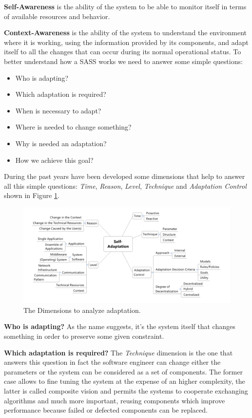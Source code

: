 \textbf{Self-Awareness} is the ability of the system to be able to monitor itself in terms of available resources and behavior.

\textbf{Context-Awareness} is the ability of the system to understand the environment where it is working, using the information provided by its components, and adapt itself to all the changes that can occur during its normal operational status.
To better understand how a SASS works we need to answer some simple questions:
\begin{itemize}
	\item Who is adapting?
	\item Which adaptation is required?
	\item When is necessary to adapt?
	\item Where is needed to change something?
	\item Why is needed an adaptation?
	\item How we achieve this goal?
\end{itemize}

During the past years have been developed some dimensions that help to answer all this simple questions: \emph{Time}, \emph{Reason}, \emph{Level}, \emph{Technique} and \emph{Adaptation Control} shown in Figure \ref{fig:dimensions}.
\begin{figure}[h]
	\centerline
	{\includegraphics[scale=0.50]{img/dimensions.png}}
	\caption[The Dimensions]{The Dimensions to analyze adaptation.\cite{eng-appr-sas}}
	\label{fig:dimensions}
\end{figure}

\textbf{Who is adapting?} As the name suggests, it's the system itself that changes something in order to preserve some given constraint.

\textbf{Which adaptation is required?} The \emph{Technique} dimension is the one that answers this question in fact the software engineer can change either the parameters or the system can be considered as a set of components. The former case allows to fine tuning the system at the expense of an higher complexity, the latter is called composite vision and permits the systems to cooperate exchanging algorithms and much more important, reusing components which improve performance because failed or defected components can be replaced.

